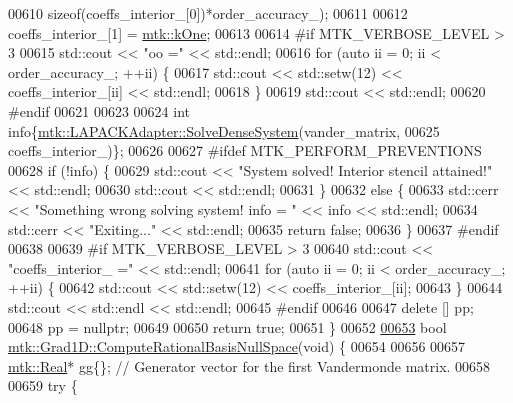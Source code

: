 \begin{DoxyCode}
{{00610 \textcolor{keyword}{sizeof}(coeffs\_interior\_[0])*order\_accuracy\_);
00611 
00612   coeffs\_interior\_[1] = \hyperlink{group__c01-roots_ga26407c24d43b6b95480943340d285c71}{mtk::kOne};
00613 
00614 \textcolor{preprocessor}{  #if MTK\_VERBOSE\_LEVEL > 3}
00615   std::cout << \textcolor{stringliteral}{"oo ="} << std::endl;
00616   \textcolor{keywordflow}{for} (\textcolor{keyword}{auto} ii = 0; ii < order\_accuracy\_; ++ii) \{
00617     std::cout << std::setw(12) << coeffs\_interior\_[ii] << std::endl;
00618   \}
00619   std::cout << std::endl;
00620 \textcolor{preprocessor}{  #endif}
00621 
00623 
00624   \textcolor{keywordtype}{int} info\{\hyperlink{classmtk_1_1LAPACKAdapter_a7428bccf74fd4a4af68fb7233846da22}{mtk::LAPACKAdapter::SolveDenseSystem}(vander\_matrix,
00625                                                 coeffs\_interior\_)\};
00626 
00627 \textcolor{preprocessor}{  #ifdef MTK\_PERFORM\_PREVENTIONS}
00628   \textcolor{keywordflow}{if} (!info) \{
00629     std::cout << \textcolor{stringliteral}{"System solved! Interior stencil attained!"} << std::endl;
00630     std::cout << std::endl;
00631   \}
00632   \textcolor{keywordflow}{else} \{
00633     std::cerr << \textcolor{stringliteral}{"Something wrong solving system! info = "} << info << std::endl;
00634     std::cerr << \textcolor{stringliteral}{"Exiting..."} << std::endl;
00635     \textcolor{keywordflow}{return} \textcolor{keyword}{false};
00636   \}
00637 \textcolor{preprocessor}{  #endif}
00638 
00639 \textcolor{preprocessor}{  #if MTK\_VERBOSE\_LEVEL > 3}
00640   std::cout << \textcolor{stringliteral}{"coeffs\_interior\_ ="} << std::endl;
00641   \textcolor{keywordflow}{for} (\textcolor{keyword}{auto} ii = 0; ii < order\_accuracy\_; ++ii) \{
00642     std::cout << std::setw(12) << coeffs\_interior\_[ii];
00643   \}
00644   std::cout << std::endl << std::endl;
00645 \textcolor{preprocessor}{  #endif}
00646 
00647   \textcolor{keyword}{delete} [] pp;
00648   pp = \textcolor{keyword}{nullptr};
00649 
00650   \textcolor{keywordflow}{return} \textcolor{keyword}{true};
00651 \}
00652 
\hypertarget{mtk__grad__1d_8cc_source_l00653}{}\hyperlink{classmtk_1_1Grad1D_a2d03e6a3961bee558f575ec4099782a9}{00653} \textcolor{keywordtype}{bool} \hyperlink{classmtk_1_1Grad1D_a2d03e6a3961bee558f575ec4099782a9}{mtk::Grad1D::ComputeRationalBasisNullSpace}(\textcolor{keywordtype}{void}) \{
00654 
00656 
00657   \hyperlink{group__c01-roots_gac080bbbf5cbb5502c9f00405f894857d}{mtk::Real}* gg\{\}; \textcolor{comment}{// Generator vector for the first Vandermonde matrix.}
00658 
00659   \textcolor{keywordflow}{try} \{
}}
\end{DoxyCode}
